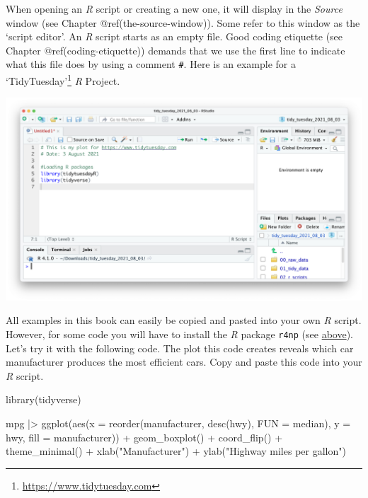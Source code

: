 \documentclass[
  letterpaper,
]{krantz}
\makeatletter
\newenvironment{Shaded}{\begin{snugshade}}{\end{snugshade}}
\newcommand{\AttributeTok}[1]{\textcolor[rgb]{0.40,0.45,0.13}{#1}}
\newcommand{\FunctionTok}[1]{\textcolor[rgb]{0.28,0.35,0.67}{#1}}
\newcommand{\NormalTok}[1]{\textcolor[rgb]{0.00,0.23,0.31}{#1}}
\newcommand{\SpecialCharTok}[1]{\textcolor[rgb]{0.37,0.37,0.37}{#1}}
\newcommand{\StringTok}[1]{\textcolor[rgb]{0.13,0.47,0.30}{#1}}
\renewcommand{\href}[2]{#2\footnote{\url{#1}}}
\newenvironment{kframe}{%
\medskip{}
\setlength{\fboxsep}{.8em}
 \def\at@end@of@kframe{}%
 \ifinner\ifhmode%
  \def\at@end@of@kframe{\end{minipage}}%
  \begin{minipage}{\columnwidth}%
 \fi\fi%
 \def\FrameCommand##1{\hskip\@totalleftmargin \hskip-\fboxsep
 \colorbox{shadecolor}{##1}\hskip-\fboxsep
     \hskip-\linewidth \hskip-\@totalleftmargin \hskip\columnwidth}%
 \MakeFramed {\advance\hsize-\width
   \@totalleftmargin\z@ \linewidth\hsize
   \@setminipage}}%
 {\par\unskip\endMakeFramed%
 \at@end@of@kframe}
\renewenvironment{Shaded}{\begin{kframe}}{\end{kframe}}
\makeatother
\begin{document}
When opening an \emph{R} script or creating a new one, it will display
in the \emph{Source} window (see Chapter @ref(the-source-window)). Some
refer to this window as the `script editor'. An \emph{R} script starts
as an empty file. Good coding etiquette (see Chapter
@ref(coding-etiquette)) demands that we use the first line to indicate
what this file does by using a comment \texttt{\#}. Here is an example
for a \href{https://www.tidytuesday.com}{`TidyTuesday'} \emph{R}
Project.

\includegraphics{images/chapter_06_img/02_r_script/00_r_script.png}

All examples in this book can easily be copied and pasted into your own
\emph{R} script. However, for some code you will have to install the
\emph{R} package \texttt{r4np} (see \hyperref[install_r4np]{above}).
Let's try it with the following code. The plot this code creates reveals
which car manufacturer produces the most efficient cars. Copy and paste
this code into your \emph{R} script.

\begin{Shaded}
\begin{Highlighting}[]
\FunctionTok{library}\NormalTok{(tidyverse)}

\NormalTok{mpg }\SpecialCharTok{|\textgreater{}} \FunctionTok{ggplot}\NormalTok{(}\FunctionTok{aes}\NormalTok{(}\AttributeTok{x =} \FunctionTok{reorder}\NormalTok{(manufacturer, }\FunctionTok{desc}\NormalTok{(hwy), }\AttributeTok{FUN =}\NormalTok{ median),}
                   \AttributeTok{y =}\NormalTok{ hwy,}
                   \AttributeTok{fill =}\NormalTok{ manufacturer)) }\SpecialCharTok{+}
  \FunctionTok{geom\_boxplot}\NormalTok{() }\SpecialCharTok{+}
  \FunctionTok{coord\_flip}\NormalTok{() }\SpecialCharTok{+}
  \FunctionTok{theme\_minimal}\NormalTok{() }\SpecialCharTok{+}
  \FunctionTok{xlab}\NormalTok{(}\StringTok{"Manufacturer"}\NormalTok{) }\SpecialCharTok{+}
  \FunctionTok{ylab}\NormalTok{(}\StringTok{"Highway miles per gallon"}\NormalTok{)}
\end{Highlighting}
\end{Shaded}
\end{document}
